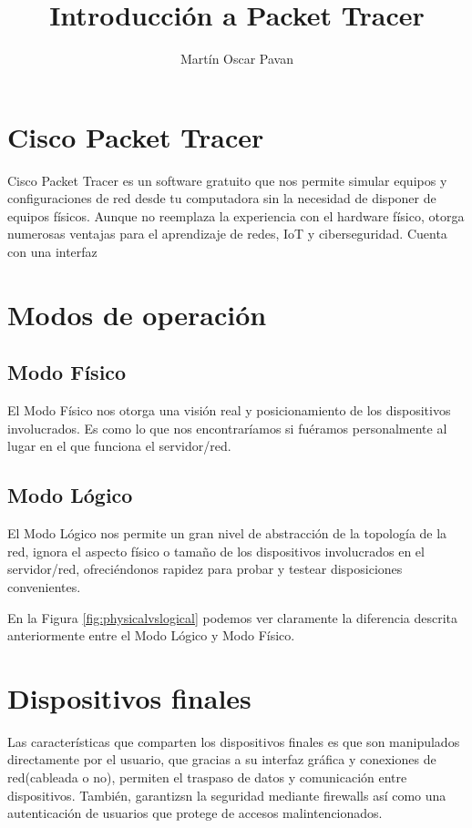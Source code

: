 \documentclass{article}
\title{Introducción a Packet Tracer}
\author{Martín Oscar Pavan }
\begin{document}
\maketitle


\section{Cisco Packet Tracer}

Cisco Packet Tracer es un software gratuito que nos permite simular equipos y configuraciones de red desde tu computadora sin la necesidad de disponer de equipos físicos. Aunque no reemplaza la experiencia con el hardware físico, otorga numerosas ventajas para el aprendizaje de redes, IoT y ciberseguridad. Cuenta con una interfaz 



\section{Modos de operación}
\subsection{Modo Físico}
El Modo Físico nos otorga una visión real y posicionamiento de los dispositivos involucrados. Es como lo que nos encontraríamos si fuéramos personalmente al lugar en el que funciona el servidor/red.
\subsection{Modo Lógico}
El Modo Lógico nos permite un gran nivel de abstracción de la topología de la red, ignora el aspecto físico o tamaño de los dispositivos involucrados en el servidor/red, ofreciéndonos rapidez para probar y testear disposiciones convenientes.

En la Figura \ref{fig:physicalvslogical} podemos ver claramente la diferencia descrita anteriormente entre el Modo Lógico y Modo Físico.

\section{Dispositivos finales}
Las características que comparten los dispositivos finales es que son manipulados directamente por el usuario, que gracias a su interfaz gráfica y conexiones de red(cableada o no), permiten el traspaso de datos y comunicación entre dispositivos. También, garantizsn la seguridad mediante firewalls así como una autenticación de usuarios que protege de accesos malintencionados.   
\end{document}
